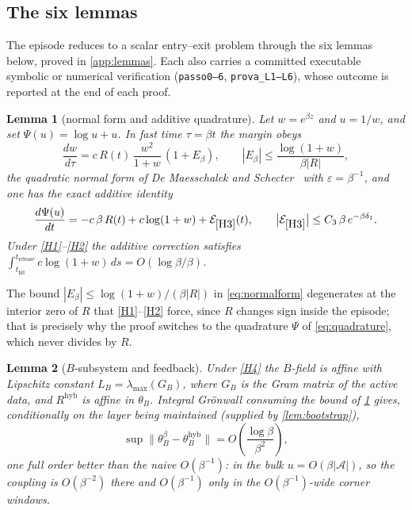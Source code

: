 \documentclass[11pt]{article}
\newtheorem{lemma}[lemma]{Lemma}
\theoremstyle{definition}
\theoremstyle{remark}
\newcommand{\thit}{t_{\mathrm{hit}}}
\newcommand{\trel}{t_{\mathrm{release}}}
\newcommand{\Ar}{\mathcal{A}}                      %
\newcommand{\hyb}{\mathrm{hyb}}
\begin{document}
\subsection{The six lemmas}\label{sec:lemmas}

The episode reduces to a scalar entry--exit problem through the six lemmas below,
proved in \cref{app:lemmas}. Each also carries a committed executable symbolic or
numerical verification (\texttt{passo0--6}, \texttt{prova\_L1--L6}), whose
outcome is reported at the end of each proof.

\begin{lemma}[normal form and additive quadrature]\label{lem:gauge}
Let $w=e^{\beta z}$ and $u=1/w$, and set $\Psi(u)=\log u+u$. In fast time
$\tau=\beta t$ the margin obeys
\begin{equation}\label{eq:normalform}
\frac{dw}{d\tau}=c\,R(t)\,\frac{w^{2}}{1+w}\,(1+E_\beta),
\qquad
|E_\beta|\le\frac{\log(1+w)}{\beta|R|},
\end{equation}
the quadratic normal form of De Maesschalck and
Schecter~\cite[equations~(1.9)--(1.10)]{DMS16} with $\varepsilon=\beta^{-1}$,
and one has the exact additive
identity
\begin{equation}\label{eq:quadrature}
\frac{d\Psi(u)}{dt}=-c\,\beta\,R(t)+c\log(1+w)+\mathcal{E}_{\eqref{H3}}(t),
\qquad
\bigl|\mathcal{E}_{\eqref{H3}}\bigr|\le C_3\,\beta\,e^{-\beta\delta_1}.
\end{equation}
Under \eqref{H1}--\eqref{H2} the additive correction satisfies
$\int_{\thit}^{\trel}c\log(1+w)\,ds=O(\log\beta/\beta)$.
\end{lemma}

\noindent The bound $|E_\beta|\le\log(1+w)/(\beta|R|)$ in
\eqref{eq:normalform} degenerates at the interior zero of $R$ that
\eqref{H1}--\eqref{H2} force, since $R$ changes sign inside the episode; that
is precisely why the proof switches to the quadrature $\Psi$ of
\eqref{eq:quadrature}, which never divides by $R$.

\begin{lemma}[$B$-subsystem and feedback]\label{lem:gronwall}
Under \eqref{H4} the $B$-field is affine with Lipschitz constant
$L_B=\lambda_{\max}(G_B)$, where $G_B$ is the Gram matrix of the active data, and
$R^{\hyb}$ is affine in $\theta_B$. Integral Gr\"onwall consuming the bound of
\cref{lem:gauge} gives, conditionally on the layer being maintained (supplied by
\cref{lem:bootstrap}),
\begin{equation}\label{eq:Brate}
\sup\bigl\|\theta_B^\beta-\theta_B^{\hyb}\bigr\|=O\!\left(\frac{\log\beta}{\beta^{2}}\right),
\end{equation}
one full order better than the naive $O(\beta^{-1})$: in the bulk
$u=O(\beta|\Ar|)$, so the coupling is $O(\beta^{-2})$ there and $O(\beta^{-1})$
only in the $O(\beta^{-1})$-wide corner windows.
\end{lemma}
\end{document}
